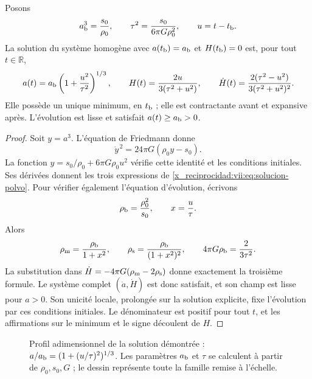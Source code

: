 \begin{theorem}
\label{x_reciprocidad:vii:thm:rebote-polvo}
Posons
\[
 a_{\rm b}^3=\frac{s_0}{\rho_0},\qquad
 \tau^2=\frac{s_0}{6\pi G\rho_0^2},\qquad u=t-t_{\rm b}.
\]
La solution du système homogène avec
\(a(t_{\rm b})=a_{\rm b}\) et \(H(t_{\rm b})=0\) est, pour tout
\(t\in\mathbb R\),
\begin{equation}
 a(t)=a_{\rm b}\left(1+\frac{u^2}{\tau^2}\right)^{1/3},
 \qquad H(t)=\frac{2u}{3(\tau^2+u^2)},\qquad
 \dot H(t)=\frac{2(\tau^2-u^2)}{3(\tau^2+u^2)^2}.
 \label{x_reciprocidad:vii:eq:solucion-polvo}
\end{equation}
Elle possède un unique minimum, en \(t_{\rm b}\) ; elle est contractante avant et expansive après. L'évolution est lisse et satisfait \(a(t)\geq a_{\rm b}>0\).
\end{theorem}
\begin{proof}
Soit \(y=a^3\). L'équation de Friedmann donne
\[
 \dot y^{\,2}=24\pi G(\rho_0y-s_0).
\]
La fonction \(y=s_0/\rho_0+6\pi G\rho_0u^2\) vérifie cette
identité et les conditions initiales. Ses dérivées donnent les
trois expressions de \eqref{x_reciprocidad:vii:eq:solucion-polvo}. Pour vérifier
également l'équation d'évolution, écrivons
\[
 \rho_{\rm b}=\frac{\rho_0^2}{s_0},\qquad
 x=\frac{u}{\tau}.
\]
Alors
\[
 \rho_{\rm m}=\frac{\rho_{\rm b}}{1+x^2},\qquad
 \rho_{\rm s}=\frac{\rho_{\rm b}}{(1+x^2)^2},\qquad
 4\pi G\rho_{\rm b}=\frac{2}{3\tau^2}.
\]
La substitution dans \(\dot H=-4\pi G(\rho_{\rm m}-2\rho_{\rm s})\) donne exactement la troisième formule. Le système complet \((\dot a,\dot H)\) est donc satisfait, et son champ est lisse pour \(a>0\). Son unicité locale, prolongée sur la solution explicite, fixe l'évolution par ces conditions initiales. Le dénominateur est positif pour tout \(t\), et les affirmations sur le minimum et le signe découlent de \(H\).
\end{proof}

\begin{figure}[htbp]
\centering
{}
\caption{Profil adimensionnel de la solution démontrée :
\(a/a_{\rm b}=(1+(u/\tau)^2)^{1/3}\).
Les paramètres \(a_{\rm b}\) et \(\tau\) se calculent à partir de
\(\rho_0,s_0,G\) ; le dessin représente toute la famille remise à l'échelle.}
\label{x_reciprocidad:vii:fig:rebote-polvo}
\end{figure}

